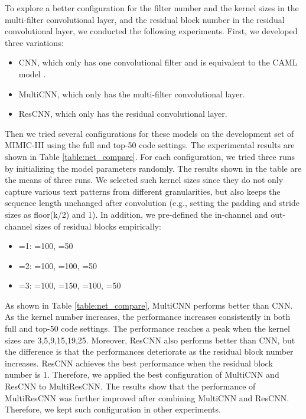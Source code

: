 \documentclass[letterpaper]{article} \usepackage{aaai20}  \usepackage{times}  \usepackage{helvet} \usepackage{courier}  \usepackage[hyphens]{url}  \usepackage{graphicx} \urlstyle{rm} \def\UrlFont{\rm}  \usepackage{graphicx}  \frenchspacing  \setlength{\pdfpagewidth}{8.5in}  \setlength{\pdfpageheight}{11in}
\begin{document}
To explore a better configuration for the filter number  and the kernel sizes  in the multi-filter convolutional layer, and the residual block number  in the residual convolutional layer, we conducted the following experiments. First, we developed three variations:

\begin{itemize}
\item CNN, which only has one convolutional filter and is equivalent to the CAML model \cite{mullenbach2018explainable}.
\item MultiCNN, which only has the multi-filter convolutional layer.
\item ResCNN, which only has the residual convolutional layer.
\end{itemize}


Then we tried several configurations for these models on the development set of MIMIC-III using the full and top-50 code settings. The experimental results are shown in Table \ref{table:net_compare}. For each configuration, we tried three runs by initializing the model parameters randomly. The results shown in the table are the means of three runs. We selected such kernel sizes since they do not only capture various text patterns from different granularities, but also
keeps the sequence length unchanged after convolution (e.g., setting the padding and stride sizes as floor(k/2) and 1). In addition, we pre-defined the in-channel and out-channel sizes of residual blocks empirically:


\begin{itemize}
\item =1: =100, =50
\item =2: =100, =100, =50
\item =3: =100, =150, =100, =50
\end{itemize}

As shown in Table \ref{table:net_compare}, MultiCNN performs better than CNN. As the kernel number increases, the performance increases consistently in both full and top-50 code settings. The performance reaches a peak when the kernel sizes are 3,5,9,15,19,25. Moreover, ResCNN also performs better than CNN, but the difference is that the performances deteriorate as the residual block number increases. ResCNN achieves the best performance when the residual block number is 1. Therefore, we applied the best configuration of MultiCNN and ResCNN to MultiResCNN. The results show that the performance of MultiResCNN was further improved after combining MultiCNN and ResCNN. Therefore, we kept such configuration in other experiments.
\end{document}
